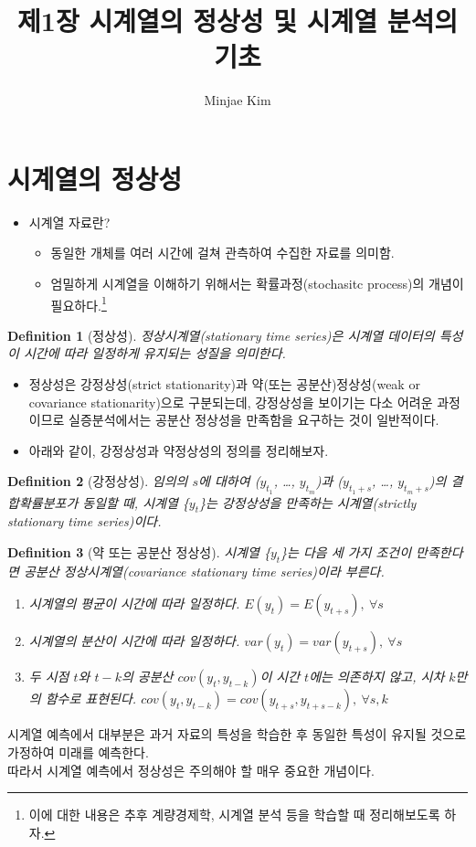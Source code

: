 \documentclass{article}
\title{제1장 시계열의 정상성 및 시계열 분석의 기초}
\author{Minjae Kim}
\date{} %
\newtheorem{defn}{Definition}
\begin{document}
\sloppy
\doublespacing
\maketitle
\section{시계열의 정상성}
  \begin{itemize}
    \item 시계열 자료란?
      \begin{itemize}
        \item 동일한 개체를 여러 시간에 걸쳐 관측하여 수집한 자료를 의미함.
        \item 엄밀하게 시계열을 이해하기 위해서는 확률과정(stochasitc process)의 개념이 필요하다.\footnote{이에 대한 내용은 추후 계량경제학, 시계열 분석 등을 학습할 때 정리해보도록 하자.} 
      \end{itemize}
  \end{itemize}
\begin{defn}[정상성]\label{def:stationarity}
\emph{정상시계열}(stationary time series)은 시계열 데이터의 특성이 시간에 따라 일정하게 유지되는 성질을 의미한다. 
\end{defn}
  \begin{itemize}
    \item 정상성은 강정상성(strict stationarity)과 약(또는 공분산)정상성(weak or covariance stationarity)으로 구분되는데, 강정상성을 보이기는 다소 어려운 과정이므로 실증분석에서는 공분산 정상성을 만족함을 요구하는 것이 일반적이다.
    \item 아래와 같이, 강정상성과 약정상성의 정의를 정리해보자.
  \end{itemize}
\begin{defn}[강정상성]\label{def:strict stationarity}
임의의 $s$에 대하여 ($y_{t_{1}}$, \dots , $y_{t_{m}}$)과 ($y_{t_{1} + s}$, \dots , $y_{t_{m} + s}$)의 결합확률분포가 동일할 때,
시계열 \{$y_{t}$\}는 \emph{강정상성을 만족하는 시계열}(strictly stationary time series)이다.
\end{defn}
\begin{defn}[약 또는 공분산 정상성]\label{def:weak(covariance) stationarity}
시계열 \{$y_{t}$\}는 다음 세 가지 조건이 만족한다면 \emph{공분산 정상시계열}(covariance stationary time series)이라 부른다.
  \begin{enumerate}
    \item 시계열의 평균이 시간에 따라 일정하다. $E(y_t) = E(y_{t+s}), \ \forall s$
    \item 시계열의 분산이 시간에 따라 일정하다. $var(y_t) = var(y_{t+s}), \ \forall s$
    \item 두 시점 $t$와 $t-k$의 공분산 $cov(y_{t}, y_{t-k})$이 시간 $t$에는 의존하지 않고, 시차 $k$만의 함수로 표현된다. $cov(y_t, y_{t-k}) = cov(y_{t+s}, y_{t+s-k}), \ \forall s, k$
  \end{enumerate}  
\end{defn}
시계열 예측에서 대부분은 과거 자료의 특성을 학습한 후 동일한 특성이 유지될 것으로 가정하여 미래를 예측한다.\\
따라서 시계열 예측에서 정상성은 주의해야 할 매우 중요한 개념이다.
\newpage
\end{document}
